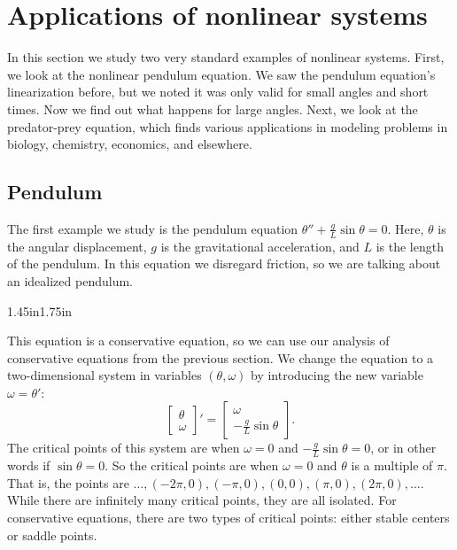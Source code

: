 
\sectionnewpage
\section{Applications of nonlinear systems}
\label{nlinapps:section}



In this section we study two very standard examples of nonlinear
systems.  First, we look at the nonlinear pendulum equation.  We saw
the pendulum equation's linearization before, but we noted it
was only valid for small angles and short times.  Now we find out what
happens for large angles.  Next, we look at the predator-prey equation,
which finds various applications in modeling problems in biology, chemistry,
economics, and elsewhere.

\subsection{Pendulum}

The first example we study is the pendulum equation
$\theta''+\frac{g}{L} \sin \theta = 0$.  Here, $\theta$ is the angular
displacement, $g$ is the gravitational acceleration, and $L$ is the length of
the pendulum.  In this equation we disregard friction, so we are talking
about an idealized pendulum.

\begin{mywrapfigsimp}{1.45in}{1.75in}
\noindent
{}
\end{mywrapfigsimp}
This equation is a conservative
equation, so we can use our analysis of conservative equations
from the previous section.
We change the equation to a two-dimensional
system in variables $(\theta,\omega)$ by introducing the new
variable $\omega = \theta'$:
\begin{equation*}
\begin{bmatrix}
\theta \\ \omega
\end{bmatrix} '
=
\begin{bmatrix}
\omega \\
- \frac{g}{L} \sin \theta
\end{bmatrix} .
\end{equation*}
The critical points of this system are when $\omega = 0$ and $-\frac{g}{L}
\sin \theta = 0$, or in other words if $\sin \theta = 0$.  So the critical
points are when $\omega = 0$ and $\theta$ is a multiple of $\pi$.  That is,
the points are $\ldots, (-2\pi,0), (-\pi,0), (0,0), (\pi,0), (2\pi,0),
\ldots$.  While there are infinitely many critical points, they are all isolated.
For conservative equations, there are two types of
critical points: either stable centers or saddle points.

